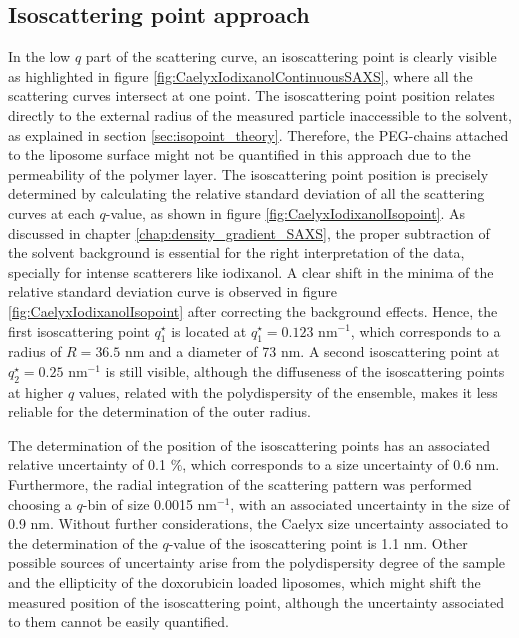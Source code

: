 \subsection{Isoscattering point approach}
In the low $q$ part of the scattering curve, an isoscattering point is clearly visible as highlighted in figure \ref{fig:CaelyxIodixanolContinuousSAXS}, where all the scattering curves intersect at one point. The isoscattering point position relates directly to the external radius of the measured particle inaccessible to the solvent, as explained in section \ref{sec:isopoint_theory}. Therefore, the PEG-chains attached to the liposome surface might not be quantified in this approach due to the permeability of the polymer layer. The isoscattering point position is precisely determined by calculating the relative standard deviation of all the scattering curves at each $q$-value, as shown in figure \ref{fig:CaelyxIodixanolIsopoint}. As discussed in chapter \ref{chap:density_gradient_SAXS}, the proper subtraction of the solvent background is essential for the right interpretation of the data, specially for intense scatterers like iodixanol. A clear shift in the minima of the relative standard deviation curve is observed in figure \ref{fig:CaelyxIodixanolIsopoint} after correcting the background effects. Hence, the first isoscattering point $q^{\star}_1$ is located at $q^{\star}_1 = 0.123$ nm$^{-1}$, which corresponds to a radius of $R = 36.5$ nm and a diameter of 73 nm. A second isoscattering point at $q^{\star}_2 = 0.25$ nm$^{-1}$ is still visible, although the diffuseness of the isoscattering points at higher $q$ values, related with the polydispersity of the ensemble, makes it less reliable for the determination of the outer radius.

The determination of the position of the isoscattering points has an associated relative uncertainty of 0.1 $\%$, which corresponds to a size uncertainty of 0.6 nm. Furthermore, the radial integration of the scattering pattern was performed choosing a $q$-bin of size 0.0015 nm$^{-1}$, with an associated uncertainty in the size of 0.9 nm. Without further considerations, the Caelyx size uncertainty associated to the determination of the $q$-value of the isoscattering point is 1.1 nm. Other possible sources of uncertainty arise from the polydispersity degree of the sample and the ellipticity of the doxorubicin loaded liposomes, which might shift the measured position of the isoscattering point, although the uncertainty associated to them cannot be easily quantified. 

